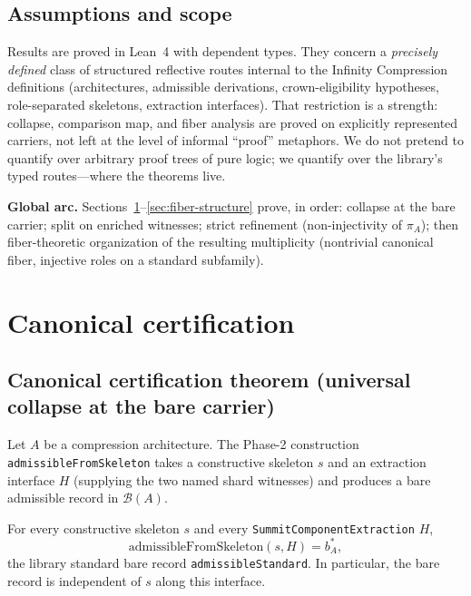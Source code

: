 \documentclass[11pt]{article}
\begin{document}
\subsection{Assumptions and scope}\label{sec:framework-assumed}
Results are proved in Lean~4 with dependent types. They concern a \emph{precisely defined} class of structured reflective routes internal to the Infinity Compression definitions (architectures, admissible derivations, crown-eligibility hypotheses, role-separated skeletons, extraction interfaces). That restriction is a strength: collapse, comparison map, and fiber analysis are proved on explicitly represented carriers, not left at the level of informal ``proof'' metaphors. We do not pretend to quantify over arbitrary proof trees of pure logic; we quantify over the library's typed routes---where the theorems live.

\medskip
\noindent\textbf{Global arc.} Sections~\ref{sec:canonical-cert}--\ref{sec:fiber-structure} prove, in order: collapse at the bare carrier; split on enriched witnesses; strict refinement (non-injectivity of $\pi_A$); then fiber-theoretic organization of the resulting multiplicity (nontrivial canonical fiber, injective roles on a standard subfamily).

\section{Canonical certification}\label{sec:canonical-cert}

\subsection{Canonical certification theorem (universal collapse at the bare carrier)}\label{sec:canonical-cert-thm}
Let $A$ be a compression architecture. The Phase-2 construction \texttt{admissibleFromSkeleton} takes a constructive skeleton $s$ and an extraction interface $H$ (supplying the two named shard witnesses) and produces a bare admissible record in $\mathcal{B}(A)$.

\begin{theorem}\label{thm:canonical-cert-math}
For every constructive skeleton $s$ and every \texttt{SummitComponentExtraction} $H$,
\[
  \mathrm{admissibleFromSkeleton}(s,H) = b^\ast_A,
\]
the library standard bare record \texttt{admissibleStandard}. In particular, the bare record is independent of $s$ along this interface.
\end{theorem}
\end{document}
